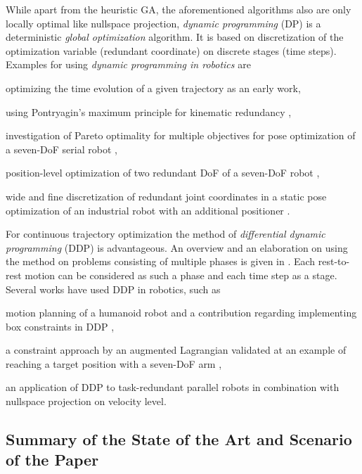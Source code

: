 \documentclass[runningheads]{llncs}
\begin{document}
While apart from the heuristic GA, the aforementioned algorithms also are only locally optimal like nullspace projection, \emph{dynamic programming} (DP) is a deterministic \emph{global optimization} algorithm.
It is based on discretization of the optimization variable (redundant coordinate) on discrete stages (time steps).
Examples for using \emph{dynamic programming in robotics} are 
\begin{compactitem}
\item optimizing the time evolution of a given trajectory \cite{ShinMcK1986} as an early work,
\item using Pontryagin's
maximum principle for kinematic redundancy \cite{NakamuraHan1987},
\item investigation of Pareto optimality for multiple objectives for pose optimization of a seven-DoF serial robot \cite{GuigueAhmHayLan2007},
\item position-level optimization of two redundant DoF of a seven-DoF robot \cite{Schappler2013_B371},
\item wide and fine discretization of redundant joint coordinates in a static pose optimization of an industrial robot with an additional positioner \cite{GaoPasCar2017}.
\end{compactitem}

For continuous trajectory optimization the method of \emph{differential dynamic programming} (DDP) is advantageous.
An overview and an elaboration on using the method on problems consisting of multiple phases is given in \cite{LantoineRus2012}.
Each rest-to-rest motion can be considered as such a phase and each time step as a stage.
Several works have used DDP in robotics, such as
\begin{compactitem}
\item motion planning of a humanoid robot and a contribution regarding implementing box constraints in DDP \cite{TassaManTod2014},
\item a constraint approach by an augmented Lagrangian validated at an example of reaching a target position with a seven-DoF arm \cite{HowellJacMan2019},
\item an application of DDP to task-redundant parallel robots \cite{SantosSil2017} in combination with nullspace projection on velocity level.
\end{compactitem}

\subsection{Summary of the State of the Art and Scenario of the Paper}
\end{document}
